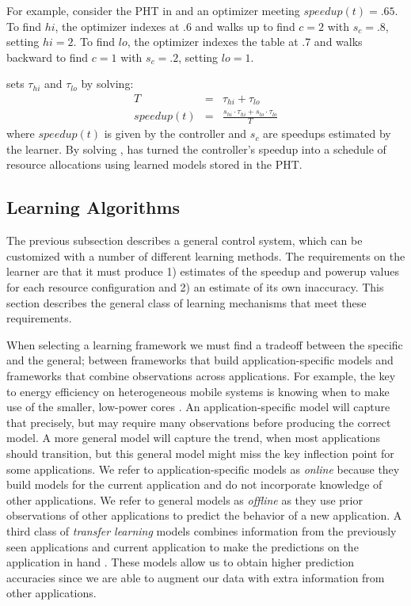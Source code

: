 For example, consider the PHT in  and an optimizer
meeting $speedup(t) = .65$.  To find $hi$, the optimizer indexes at .6
and walks up to find $c=2$ with $s_c=.8$, setting $hi = 2$.  To find
$lo$, the optimizer indexes the table at .7 and walks backward to find
$c=1$ with $s_c=.2$, setting $lo = 1$.

\SYSTEM{} sets $\tau_{hi}$ and $\tau_{lo}$ by solving:
\begin{eqnarray}
  T &=& \tau_{hi} + \tau_{lo}    \label{eqn:s1} \\
  speedup(t) &=& \frac{s_{hi} \cdot \tau_{hi} + s_{lo} \cdot \tau_{lo}}{T} \label{eqn:s2}
\end{eqnarray}
where $speedup(t)$ is given by the controller and $s_c$ are speedups
estimated by the learner.  By solving , \SYSTEM{} has
turned the controller's speedup into a schedule of resource
allocations using learned models stored in the PHT.

\subsection{\SYSTEM{} Learning Algorithms}
The previous subsection describes a general control system, which can
be customized with a number of different learning methods.  The
requirements on the learner are that it must produce 1) estimates of
the speedup and powerup values for each resource configuration and 2)
an estimate of its own inaccuracy.
This section describes the general class of learning mechanisms that
meet these requirements. 

When selecting a learning framework we must find a tradeoff between
the specific and the general; \ie between frameworks that build
application-specific models and frameworks that combine observations
across applications.  For example, the key to energy efficiency on
heterogeneous mobile systems is knowing when to make use of the
smaller, low-power cores \cite{}.  An application-specific model will
capture that precisely, but may require many observations before
producing the correct model.  A more general model will capture the
trend, \eg when most applications should transition, but this general
model might miss the key inflection point for some applications.  We
refer to application-specific models as \emph{online} because they
build models for the current application and do not incorporate
knowledge of other applications.  We refer to general models as
\emph{offline} as they use prior observations of other applications to
predict the behavior of a new application. A third class of
\emph{transfer learning} models combines information from the
previously seen applications and current application to make the
predictions on the application in hand \cite{pan2010survey} . These models allow us to obtain higher prediction accuracies since we are able to augment our data with extra information from other applications.

